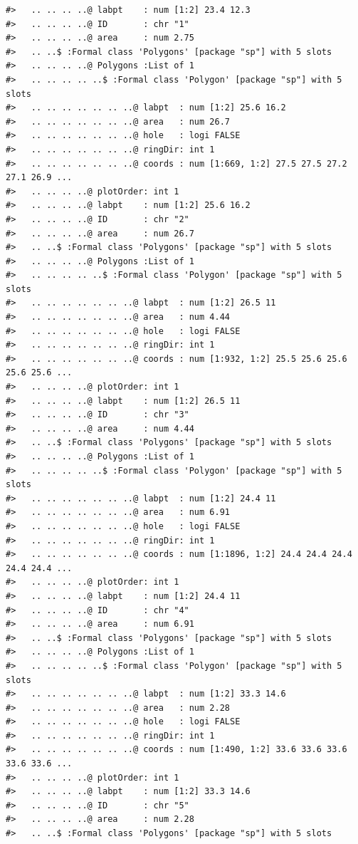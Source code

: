 \documentclass[12pt,a4paper,a4paper]{book}
\theoremstyle{definition}
\theoremstyle{definition}
\theoremstyle{definition}
\theoremstyle{remark}
\begin{document}
\begin{verbatim}
#>   .. .. .. ..@ labpt    : num [1:2] 23.4 12.3
#>   .. .. .. ..@ ID       : chr "1"
#>   .. .. .. ..@ area     : num 2.75
#>   .. ..$ :Formal class 'Polygons' [package "sp"] with 5 slots
#>   .. .. .. ..@ Polygons :List of 1
#>   .. .. .. .. ..$ :Formal class 'Polygon' [package "sp"] with 5 slots
#>   .. .. .. .. .. .. ..@ labpt  : num [1:2] 25.6 16.2
#>   .. .. .. .. .. .. ..@ area   : num 26.7
#>   .. .. .. .. .. .. ..@ hole   : logi FALSE
#>   .. .. .. .. .. .. ..@ ringDir: int 1
#>   .. .. .. .. .. .. ..@ coords : num [1:669, 1:2] 27.5 27.5 27.2 27.1 26.9 ...
#>   .. .. .. ..@ plotOrder: int 1
#>   .. .. .. ..@ labpt    : num [1:2] 25.6 16.2
#>   .. .. .. ..@ ID       : chr "2"
#>   .. .. .. ..@ area     : num 26.7
#>   .. ..$ :Formal class 'Polygons' [package "sp"] with 5 slots
#>   .. .. .. ..@ Polygons :List of 1
#>   .. .. .. .. ..$ :Formal class 'Polygon' [package "sp"] with 5 slots
#>   .. .. .. .. .. .. ..@ labpt  : num [1:2] 26.5 11
#>   .. .. .. .. .. .. ..@ area   : num 4.44
#>   .. .. .. .. .. .. ..@ hole   : logi FALSE
#>   .. .. .. .. .. .. ..@ ringDir: int 1
#>   .. .. .. .. .. .. ..@ coords : num [1:932, 1:2] 25.5 25.6 25.6 25.6 25.6 ...
#>   .. .. .. ..@ plotOrder: int 1
#>   .. .. .. ..@ labpt    : num [1:2] 26.5 11
#>   .. .. .. ..@ ID       : chr "3"
#>   .. .. .. ..@ area     : num 4.44
#>   .. ..$ :Formal class 'Polygons' [package "sp"] with 5 slots
#>   .. .. .. ..@ Polygons :List of 1
#>   .. .. .. .. ..$ :Formal class 'Polygon' [package "sp"] with 5 slots
#>   .. .. .. .. .. .. ..@ labpt  : num [1:2] 24.4 11
#>   .. .. .. .. .. .. ..@ area   : num 6.91
#>   .. .. .. .. .. .. ..@ hole   : logi FALSE
#>   .. .. .. .. .. .. ..@ ringDir: int 1
#>   .. .. .. .. .. .. ..@ coords : num [1:1896, 1:2] 24.4 24.4 24.4 24.4 24.4 ...
#>   .. .. .. ..@ plotOrder: int 1
#>   .. .. .. ..@ labpt    : num [1:2] 24.4 11
#>   .. .. .. ..@ ID       : chr "4"
#>   .. .. .. ..@ area     : num 6.91
#>   .. ..$ :Formal class 'Polygons' [package "sp"] with 5 slots
#>   .. .. .. ..@ Polygons :List of 1
#>   .. .. .. .. ..$ :Formal class 'Polygon' [package "sp"] with 5 slots
#>   .. .. .. .. .. .. ..@ labpt  : num [1:2] 33.3 14.6
#>   .. .. .. .. .. .. ..@ area   : num 2.28
#>   .. .. .. .. .. .. ..@ hole   : logi FALSE
#>   .. .. .. .. .. .. ..@ ringDir: int 1
#>   .. .. .. .. .. .. ..@ coords : num [1:490, 1:2] 33.6 33.6 33.6 33.6 33.6 ...
#>   .. .. .. ..@ plotOrder: int 1
#>   .. .. .. ..@ labpt    : num [1:2] 33.3 14.6
#>   .. .. .. ..@ ID       : chr "5"
#>   .. .. .. ..@ area     : num 2.28
#>   .. ..$ :Formal class 'Polygons' [package "sp"] with 5 slots

\end{verbatim}
\end{document}
